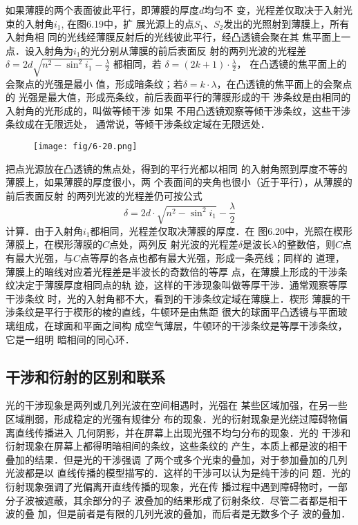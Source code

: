 如果薄膜的两个表面彼此平行，即薄膜的厚度$d$均匀不
变，光程差仅取决于入射光束的入射角$i_1$, 在图6.19中，扩
展光源上的点$S_1$、$S_2$发出的光照射到薄膜上，所有入射角相
同的光线经薄膜反射后的光线彼此平行，经凸透镜会聚在其
焦平面上一点．设入射角为$i_1$的光分别从薄膜的前后表面反
射的两列光波的光程差$\delta=2d\sqrt{n^2-\sin^2 i_1}-\frac{\lambda}{2}$
都相同，若
$\delta=(2k+1)\cdot \frac{\lambda}{2}$，
在凸透镜的焦平面上的会聚点的光强是最小
值，形成暗条纹；若$\delta=k\cdot\lambda$，在凸透镜的焦平面上的会聚点的
光强是最大值，形成亮条纹，前后表面平行的薄膜形成的干
涉条纹是由相同的入射角的光形成的，叫做等倾干涉 如果
不用凸透镜观察等倾干涉条纹，这些干涉条纹成在无限远处，
通常说，等倾干涉条纹定域在无限远处．

\begin{figure}[htp]
    \centering
     \texttt{[image: fig/6-20.png]}
    \caption{}
\end{figure}

把点光源放在凸透镜的焦点处，得到的平行光都以相同
的入射角照到厚度不等的薄膜上，如果薄膜的厚度很小，两
个表面间的夹角也很小（近于平行），从薄膜的前后表面反射
的两列光波的光程差仍可按公式
\[\delta=2d\cdot \sqrt{n^2-\sin^2 i_1}-\frac{\lambda}{2}\]
计算．由于入射角$i_1$都相同，光程差仅取决薄膜的厚度．在
图6.20中，光照在楔形薄膜上，在楔形薄膜的$C$点处，两列反
射光波的光程差$\delta$是波长$\lambda$的整数倍，则$C$点有最大光强，与$C$点等厚的各点也都有最大光强，形成一条亮线；同样的
道理，薄膜上的暗线对应着光程差是半波长的奇数倍的等厚
点，在薄膜上形成的干涉条纹决定于薄膜厚度相同点的轨
迹，这样的干涉现象叫做等厚干涉．通常观察等厚干涉条纹
时，光的入射角都不大，看到的干涉条纹定域在薄膜上．楔形
薄膜的干涉条纹是平行于楔形的棱的直线，牛顿环是由焦距
很大的球面平凸透镜与平面玻璃组成，在球面和平面之间构
成空气薄层，牛顿环的干涉条纹是等厚干涉条纹，它是一组明
暗相间的同心环．

\subsection{干涉和衍射的区别和联系}
光的干涉现象是两列或几列光波在空间相遇时，光强在
某些区域加强，在另一些区域削弱，形成稳定的光强有规律分
布的现象．光的衍射现象是光绕过障碍物偏离直线传播进入
几何阴影，并在屏幕上出现光强不均匀分布的现象．光的
干涉和衍射现象在屏幕上都得明暗相间的条纹，这些条纹的
产生，本质上都是波的相干叠加的结果．但是光的干涉强调
了两个或多个光束的叠加，对于参加叠加的几列光波都是以
直线传播的模型描写的．这样的干涉可以认为是纯干涉的问
题．光的衍射现象强调了光偏离开直线传播的现象，光在传
播过程中遇到障碍物时，一部分子波被遮蔽，其余部分的子
波叠加的结果形成了衍射条纹．尽管二者都是相干波的叠
加，但是前者是有限的几列光波的叠加，而后者是无数多个子
波的叠加．

